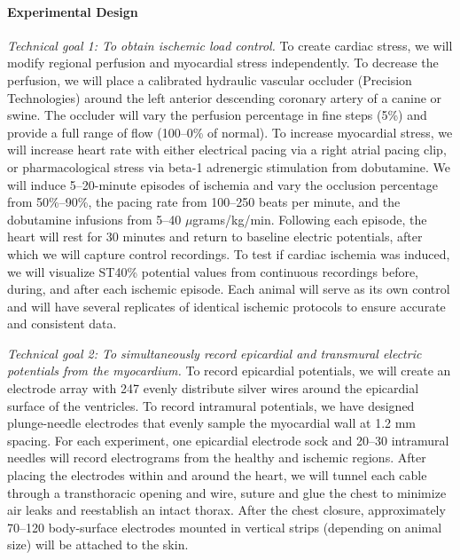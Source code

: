 \paragraph{Experimental Design} \textit{Technical goal 1: To obtain ischemic load
  control.} To create cardiac stress, we will modify regional perfusion and
myocardial stress independently. To decrease the perfusion, we will place a
calibrated hydraulic vascular occluder (Precision Technologies) around the
left anterior descending coronary artery of a canine or swine. The occluder will vary the
perfusion percentage in fine steps (5\%) and provide a full range of flow
(100--0\% of normal). To increase myocardial stress, we will increase heart
rate with either electrical pacing via a right atrial pacing clip, or
pharmacological stress via beta-1 adrenergic stimulation from
dobutamine. We will induce 5--20-minute episodes of ischemia and vary the
occlusion percentage from 50\%--90\%, the pacing rate from 100--250 beats
per minute, and the dobutamine infusions from 5--40
$\mu$grams/kg/min.\cite{BLZ:Man1988} Following each episode, the heart will
rest for 30 minutes and return to baseline electric potentials, after which
we will capture control recordings. To test if cardiac ischemia was
induced, we will visualize ST40\% potential values from continuous
recordings before, during, and after each ischemic episode. Each animal
will serve as its own control and will have several replicates of identical
ischemic protocols to ensure accurate and consistent data.

\textit{Technical goal 2: To simultaneously record epicardial and
  transmural electric potentials from the myocardium.} To record epicardial
potentials, we will create an electrode array with 247 evenly distribute
silver wires around the epicardial surface of the ventricles. To record
intramural potentials, we have designed plunge-needle electrodes that
evenly sample the myocardial wall at 1.2 mm spacing. For each
experiment, one epicardial electrode sock and 20--30 intramural needles
will record electrograms from the healthy and ischemic regions. After
placing the electrodes within and around the heart, we will tunnel each
cable through a transthoracic opening and wire, suture and glue the chest to
minimize air leaks and reestablish an intact thorax. After the chest
closure, approximately 70--120 body-surface electrodes mounted in vertical
strips (depending on animal size) will be attached to the skin.

